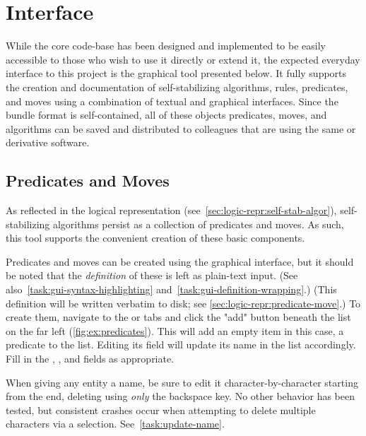 \section{Interface}
\label{sec:interface-ssa}

While the core code-base has been designed and implemented
  to be easily accessible to those who wish to use it directly or extend it,
  the expected everyday interface to this project is
  the graphical tool presented below.
It fully supports the creation and documentation of
  self-stabilizing algorithms,
  rules,
  predicates,
  and moves
  using a combination of textual and graphical interfaces.
Since the bundle format is self-contained,
  all of these objects \Dash
  predicates, moves, and algorithms \Dash
  can be saved and distributed to colleagues
  that are using the same or derivative software.

\subsection{Predicates and Moves}
As reflected in the logical representation
  (see~\autoref{sec:logic-repr:self-stab-algor}),
  self-stabilizing algorithms persist as a collection
  of predicates and moves.
As such, this tool supports the convenient creation of these basic components.

Predicates and moves can be created using the graphical interface,
  but it should be noted that the \emph{definition} of these is left
  as plain-text input.
(See also~\autoref{task:gui-syntax-highlighting} and~\autoref{task:gui-definition-wrapping}.)
(This definition will be written verbatim to disk;
  see \autoref{sec:logic-repr:predicate-move}.)
To create them, navigate to the  or  tabs
  and click the "add" button beneath the list on the far left
  (\autoref{fig:ex:predicates}).
This will add an empty item \Dash in this case, a predicate \Dash to the list.
Editing its  field will update its name in the list accordingly.
Fill in the , ,
  and  fields as appropriate.

\begin{warning}
  When giving any entity a name, be sure to edit it character-by-character starting from the end,
    deleting using \emph{only} the backspace \keys{\backspace} key.
  No other behavior has been tested, but consistent crashes occur when attempting to delete multiple
    characters via a selection.
  See~\autoref{task:update-name}.
\end{warning}

